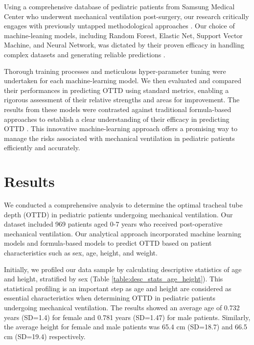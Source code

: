\documentclass[11pt]{article}
\begin{document}
Using a comprehensive database of pediatric patients from Samsung Medical Center who underwent mechanical ventilation post-surgery, our research critically engages with previously untapped methodological approaches \cite{Johnson2023MIMICIVAF, Petzsche2022ISLES2A}. Our choice of machine-leaning models, including Random Forest, Elastic Net, Support Vector Machine, and Neural Network, was dictated by their proven efficacy in handling complex datasets and generating reliable predictions \cite{Song2020SystematicEO}.

Thorough training processes and meticulous hyper-parameter tuning were undertaken for each machine-learning model. We then evaluated and compared their performances in predicting OTTD using standard metrics, enabling a rigorous assessment of their relative strengths and areas for improvement. The results from these models were contrasted against traditional formula-based approaches to establish a clear understanding of their efficacy in predicting OTTD \cite{Nunez2021MachineLP, Ari2010InfluenceON}. This innovative machine-learning approach offers a promising way to manage the risks associated with mechanical ventilation in pediatric patients efficiently and accurately.

\section*{Results}

We conducted a comprehensive analysis to determine the optimal tracheal tube depth (OTTD) in pediatric patients undergoing mechanical ventilation. Our dataset included 969 patients aged 0-7 years who received post-operative mechanical ventilation. Our analytical approach incorporated machine learning models and formula-based models to predict OTTD based on patient characteristics such as sex, age, height, and weight. 

Initially, we profiled our data sample by calculating descriptive statistics of age and height, stratified by sex (Table {}\ref{table:desc_stats_age_height}). This statistical profiling is an important step as age and height are considered as essential characteristics when determining OTTD in pediatric patients undergoing mechanical ventilation. The results showed an average age of 0.732 years (SD=1.4) for female and 0.781 years (SD=1.47) for male patients. Similarly, the average height for female and male patients was 65.4 cm (SD=18.7) and 66.5 cm (SD=19.4) respectively.
\end{document}
